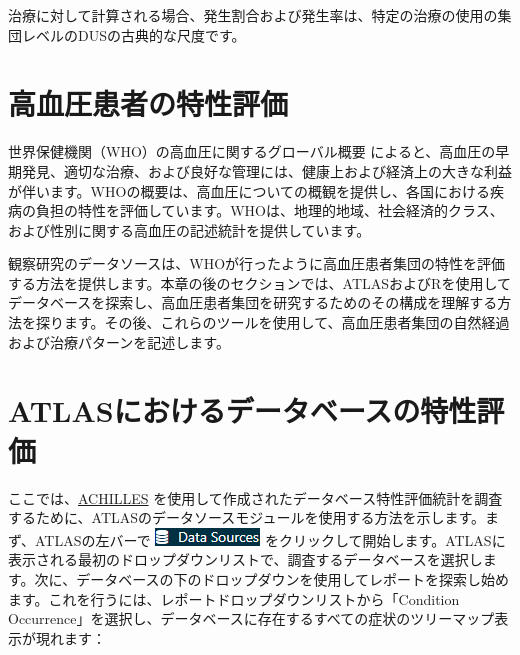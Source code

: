 \documentclass[
  11pt]{book}
\theoremstyle{definition}
\theoremstyle{definition}
\theoremstyle{definition}
\theoremstyle{definition}
\theoremstyle{remark}
\begin{document}
治療に対して計算される場合、発生割合および発生率は、特定の治療の使用の集団レベルのDUSの古典的な尺度です。

\section{高血圧患者の特性評価}\label{ux9ad8ux8840ux5727ux60a3ux8005ux306eux7279ux6027ux8a55ux4fa1}

世界保健機関（WHO）の高血圧に関するグローバル概要 \citep{WHOHypertension} によると、高血圧の早期発見、適切な治療、および良好な管理には、健康上および経済上の大きな利益が伴います。WHOの概要は、高血圧についての概観を提供し、各国における疾病の負担の特性を評価しています。WHOは、地理的地域、社会経済的クラス、および性別に関する高血圧の記述統計を提供しています。

観察研究のデータソースは、WHOが行ったように高血圧患者集団の特性を評価する方法を提供します。本章の後のセクションでは、ATLASおよびRを使用してデータベースを探索し、高血圧患者集団を研究するためのその構成を理解する方法を探ります。その後、これらのツールを使用して、高血圧患者集団の自然経過および治療パターンを記述します。

\section{ATLASにおけるデータベースの特性評価}\label{atlasux306bux304aux3051ux308bux30c7ux30fcux30bfux30d9ux30fcux30b9ux306eux7279ux6027ux8a55ux4fa1}

ここでは、\href{https://github.com/OHDSI/Achilles}{ACHILLES} を使用して作成されたデータベース特性評価統計を調査するために、ATLASのデータソースモジュールを使用する方法を示します。まず、ATLASの左バーで \includegraphics{images/Characterization/atlasDataSourcesMenuItem.png} をクリックして開始します。ATLASに表示される最初のドロップダウンリストで、調査するデータベースを選択します。次に、データベースの下のドロップダウンを使用してレポートを探索し始めます。これを行うには、レポートドロップダウンリストから「Condition Occurrence」を選択し、データベースに存在するすべての症状のツリーマップ表示が現れます：
\end{document}
